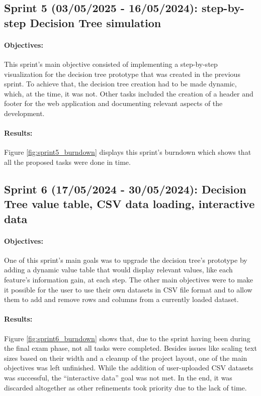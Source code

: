 \subsection{Sprint 5 (03/05/2025 - 16/05/2024): step-by-step Decision Tree simulation}
\paragraph{Objectives:}
This sprint's main objective consisted of implementing a step-by-step visualization for the decision tree prototype that was created in the previous sprint. To achieve that, the decision tree creation had to be made dynamic, which, at the time, it was not. Other tasks included the creation of a header and footer for the web application and documenting relevant aspects of the development.

\paragraph{Results:}
Figure \ref{fig:sprint5_burndown} displays this sprint's burndown which shows that all the proposed tasks were done in time.

\subsection{Sprint 6 (17/05/2024 - 30/05/2024): Decision Tree value table, CSV data loading, interactive data}
\paragraph{Objectives:}
One of this sprint's main goals was to upgrade the decision tree's prototype by adding a dynamic value table that would display relevant values, like each feature's information gain, at each step. The other main objectives were to make it possible for the user to use their own datasets in CSV file format and to allow them to add and remove rows and columns from a currently loaded dataset.

\paragraph{Results:}
Figure \ref{fig:sprint6_burndown} shows that, due to the sprint having been during the final exam phase, not all tasks were completed. Besides issues like scaling text sizes based on their width and a cleanup of the project layout, one of the main objectives was left unfinished. While the addition of user-uploaded CSV datasets was successful, the ``interactive data'' goal was not met. In the end, it was discarded altogether as other refinements took priority due to the lack of time.

